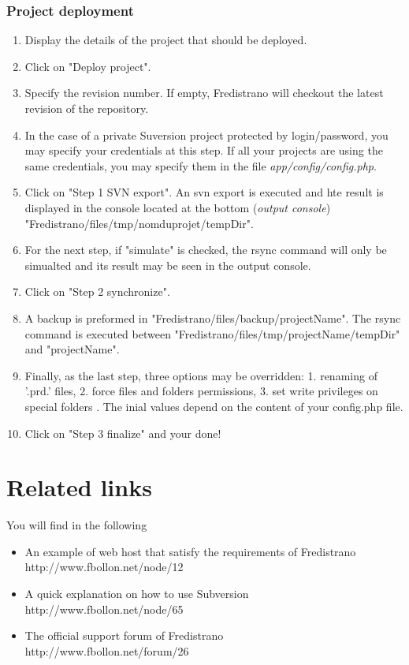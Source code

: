 \documentclass[12pt,a4paper]{report}
\begin{document}
\subsection{Project deployment}
\begin{enumerate}
\item Display the details of the project that should be deployed.
\item Click on "Deploy project".
\item Specify the revision number. If empty, Fredistrano will checkout the latest revision of the repository.
\item In the case of a private Suversion project protected by login/password, you may specify your credentials at this step. If all your projects are using the same credentials, you may specify them in the file \textit{app/config/config.php}.
\item Click on "Step 1 SVN export". An svn export is executed and hte result is displayed in the console located at the bottom (\textit{output console}) "Fredistrano/files/tmp/nomduprojet/tempDir".
\item For the next step, if "simulate" is checked, the rsync command will only be simualted and its  result may be seen in the output console.
\item Click on "Step 2 synchronize".
\item A backup is preformed in "Fredistrano/files/backup/projectName". The rsync command is executed between "Fredistrano/files/tmp/projectName/tempDir" and "projectName".
\item Finally, as the last step, three options may be overridden: 1. renaming of '.prd.' files, 2. force files and folders permissions, 3. set write privileges on special folders . The inial values depend on the content of your config.php file.
\item Click on "Step 3 finalize" and your done!
\end{enumerate}

\chapter{Related links}
You will find in the following 
\begin{itemize}
\item An example of web host that satisfy the requirements of Fredistrano \\ http://www.fbollon.net/node/12 \\
\item A quick explanation on how to use Subversion \\ http://www.fbollon.net/node/65 \\
\item The official support forum of Fredistrano \\ http://www.fbollon.net/forum/26
\end{itemize}
\end{document}
